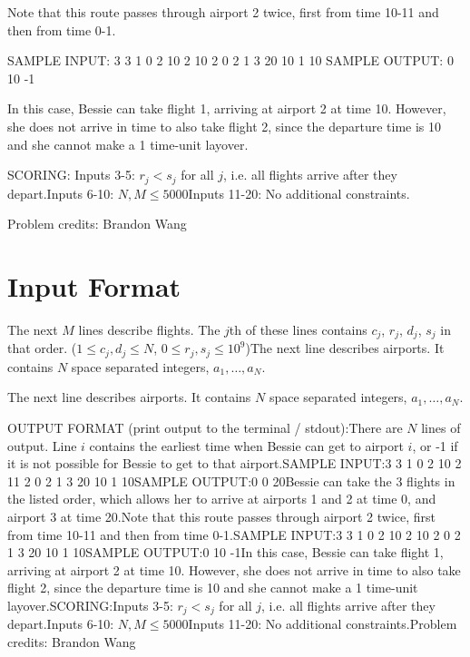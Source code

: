 \documentclass[12pt]{article}
\begin{document}
Note that this route passes through airport 2 twice, first from time 10-11 and
then from time 0-1.

SAMPLE INPUT:
3 3
1 0 2 10
2 10 2 0
2 1 3 20
10 1 10
SAMPLE OUTPUT: 
0
10
-1

In this case, Bessie can take flight 1, arriving at airport 2 at time 10.
However, she does not arrive in time to also take flight 2, since the departure
time is 10 and she cannot make a 1 time-unit layover.

SCORING:
Inputs 3-5: $r_j < s_j$ for all $j$, i.e. all flights arrive after they
depart.Inputs 6-10: $N, M \leq 5000$Inputs 11-20: No additional constraints.


Problem credits: Brandon Wang



\section*{Input Format}
The next $M$ lines describe flights.  The $j$th of these lines contains $c_j$,
$r_j$, $d_j$, $s_j$ in that order. ($1\leq c_j, d_j \leq N$,
$0\leq r_j, s_j \leq 10^9$)The next line describes airports.  It contains $N$ space separated integers,
$a_1, \ldots, a_N$.

The next line describes airports.  It contains $N$ space separated integers,
$a_1, \ldots, a_N$.

OUTPUT FORMAT (print output to the terminal / stdout):There are $N$ lines of output.  Line $i$ contains the earliest time when Bessie
can get to airport $i$,  or -1 if it is not possible for Bessie to get to that
airport.SAMPLE INPUT:3 3
1 0 2 10
2 11 2 0
2 1 3 20
10 1 10SAMPLE OUTPUT:0
0
20Bessie can take the 3 flights in the listed order, which allows her to arrive at
airports  1 and 2 at time 0, and airport 3 at time 20.Note that this route passes through airport 2 twice, first from time 10-11 and
then from time 0-1.SAMPLE INPUT:3 3
1 0 2 10
2 10 2 0
2 1 3 20
10 1 10SAMPLE OUTPUT:0
10
-1In this case, Bessie can take flight 1, arriving at airport 2 at time 10.
However, she does not arrive in time to also take flight 2, since the departure
time is 10 and she cannot make a 1 time-unit layover.SCORING:Inputs 3-5: $r_j < s_j$ for all $j$, i.e. all flights arrive after they
depart.Inputs 6-10: $N, M \leq 5000$Inputs 11-20: No additional constraints.Problem credits: Brandon Wang
\end{document}
